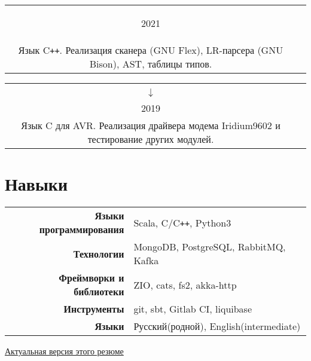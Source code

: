 \documentclass{article}
\newcommand{\entry}[3]{
	\begin{tabular}{ c | c }
    \begin{minipage}{0.05\linewidth}
    	\begin{center}
    		#1
    	\end{center}
    \end{minipage} 
    &
    \begin{minipage}{0.85\linewidth}
        \textbf{#2} \\ \footnotesize{#3}
    \end{minipage}
    \end{tabular}
}
\newcommand{\interval}[2]{
	#1 \\ $\downarrow$ \\ #2
}
\begin{document}
    \vspace{.1cm}
    
    \entry {2021}
    {\href {https://gitlab.com/Inversion/yaelc} {yaelc} - Компилятор java-подобного языка}
    { Язык C\texttt{++}. Реализация сканера (GNU Flex), LR-парсера (GNU Bison), AST, таблицы типов. } 
    
    \vspace{.1cm}
    
    \entry {\interval{2017}{2019}}
    {\href {https://github.com/cansat-rsce/librscs} {librscs} - Библиотека драйверов перифирии для микроконтроллеров AVR}
    { Язык C для AVR. Реализация драйвера модема Iridium9602 и тестирование других модулей. } 

    \section{Навыки}
    	\begin{tabular}{ >{\bfseries}r | l }
    		Языки программирования & Scala, C/C\texttt{++}, Python3 \\
    		Технологии & MongoDB, PostgreSQL, RabbitMQ, Kafka  \\
    		Фреймворки и библиотеки & ZIO, cats, fs2, akka-http \\
    		Инструменты & git, sbt, Gitlab CI, liquibase \\
    		Языки & Русский(родной), English(intermediate)
    	\end{tabular} 
        
    \vspace{\fill}
    \begin{center}
        \large
        \href {https://github.com/InversionSpaces/resume}{Актуальная версия этого резюме}
    \end{center}
\end{document}
